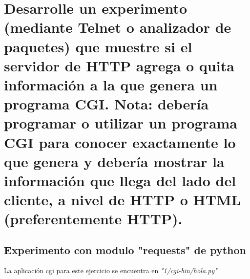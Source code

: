 \documentclass[12pt]{extarticle}
\begin{document}
    
    
    

\newpage
\tableofcontents
\newpage

    
    

    
    \section{Desarrolle un experimento (mediante Telnet o analizador de
paquetes) que muestre si el servidor de HTTP agrega o quita información
a la que genera un programa CGI. Nota: debería programar o utilizar un
programa CGI para conocer exactamente lo que genera y debería mostrar la
información que llega del lado del cliente, a nivel de HTTP o HTML
(preferentemente
HTTP).}\label{desarrolle-un-experimento-mediante-telnet-o-analizador-de-paquetes-que-muestre-si-el-servidor-de-http-agrega-o-quita-informaciuxf3n-a-la-que-genera-un-programa-cgi.-nota-deberuxeda-programar-o-utilizar-un-programa-cgi-para-conocer-exactamente-lo-que-genera-y-deberuxeda-mostrar-la-informaciuxf3n-que-llega-del-lado-del-cliente-a-nivel-de-http-o-html-preferentemente-http.}

    \subsection{Experimento con modulo "requests" de
python}\label{experimento-con-modulo-requests-de-python}

    La aplicación cgi para este ejercicio se encuentra en
\emph{"1/cgi-bin/hola.py"}
\end{document}
